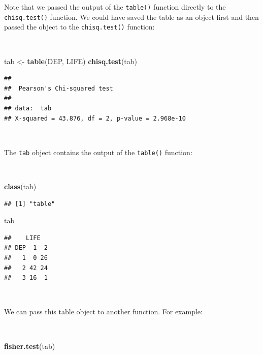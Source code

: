 \documentclass[12pt,a4paper]{book}
\newenvironment{Shaded}{\begin{snugshade}}{\end{snugshade}}
\newcommand{\KeywordTok}[1]{\textcolor[rgb]{0.13,0.29,0.53}{\textbf{#1}}}
\newcommand{\StringTok}[1]{\textcolor[rgb]{0.31,0.60,0.02}{#1}}
\newcommand{\NormalTok}[1]{#1}
\theoremstyle{definition}
\theoremstyle{definition}
\theoremstyle{definition}
\theoremstyle{remark}
\begin{document}
\newpage

Note that we passed the output of the \texttt{table()} function directly
to the \texttt{chisq.test()} function. We could have saved the table as
an object first and then passed the object to the \texttt{chisq.test()}
function:

~

\begin{Shaded}
\begin{Highlighting}[]
\NormalTok{tab <-}\StringTok{ }\KeywordTok{table}\NormalTok{(DEP, LIFE)}
\KeywordTok{chisq.test}\NormalTok{(tab)}
\end{Highlighting}
\end{Shaded}

\begin{verbatim}
## 
##  Pearson's Chi-squared test
## 
## data:  tab
## X-squared = 43.876, df = 2, p-value = 2.968e-10
\end{verbatim}

~

The \texttt{tab} object contains the output of the \texttt{table()}
function:

~

\begin{Shaded}
\begin{Highlighting}[]
\KeywordTok{class}\NormalTok{(tab)}
\end{Highlighting}
\end{Shaded}

\begin{verbatim}
## [1] "table"
\end{verbatim}

\begin{Shaded}
\begin{Highlighting}[]
\NormalTok{tab}
\end{Highlighting}
\end{Shaded}

\begin{verbatim}
##    LIFE
## DEP  1  2
##   1  0 26
##   2 42 24
##   3 16  1
\end{verbatim}

~

We can pass this table object to another function. For example:

~

\begin{Shaded}
\begin{Highlighting}[]
\KeywordTok{fisher.test}\NormalTok{(tab)}
\end{Highlighting}
\end{Shaded}
\end{document}
